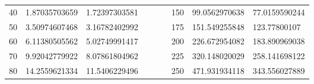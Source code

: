 \documentclass[10pt,onecolumn]{article}
\begin{document}
\begin{table}[h!]
\begin{tabular}{|c|l|l|lll|l|l|l|}
40         & 1.87035703659                                                                                 & 1.72397303581                                                                                 &  &  &  & 150                             & 99.0562970638                                                                                 & 77.0159590244                                                                                 \\ \cline{1-3} \cline{7-9} 
50         & 3.50974607468                                                                                 & 3.16782402992                                                                                 &  &  &  & 175                             & 151.549255848                                                                                 & 123.77800107                                                                                  \\ \cline{1-3} \cline{7-9} 
60         & 6.11380505562                                                                                 & 5.02749991417                                                                                 &  &  &  & 200                             & 226.672954082                                                                                 & 183.890969038                                                                                 \\ \cline{1-3} \cline{7-9} 
70         & 9.92042779922                                                                                 & 8.07861804962                                                                                 &  &  &  & 225                             & 320.148020029                                                                                 & 258.141698122                                                                                 \\ \cline{1-3} \cline{7-9} 
80         & 14.2559621334                                                                                 & 11.5406229496                                                                                 &  &  &  & 250                             & 471.931934118                                                                                 & 343.556027889                                                                                 \\ \cline{1-3} \cline{7-9} 
\end{tabular}
\end{table}
\end{document}
